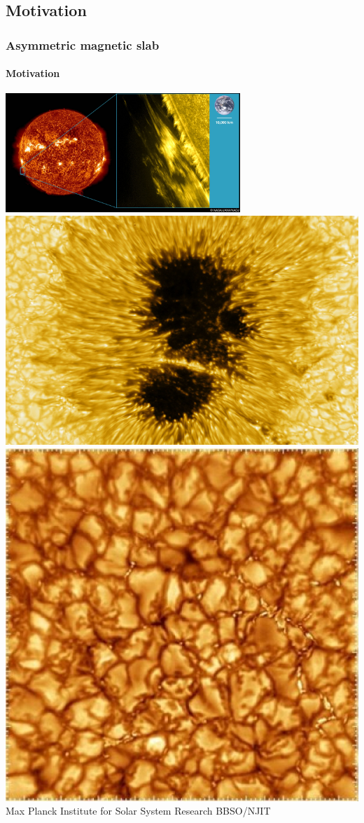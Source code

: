 \documentclass[table]{beamer}
\begin{document}
\subsection{Motivation}

\begin{frame}
\frametitle{Asymmetric magnetic slab}
\framesubtitle{Motivation}
\centering
\includegraphics[height=4.5cm]{media/hinode-prominence.jpg}
\\
\vspace*{0.05in}
\includegraphics[height=3.5 cm]{media/sunspot_lightbridge.png}
\hspace*{0.5in}
\includegraphics[height=3.5 cm]{media/granules.jpg}
\vspace*{-0.05in}
\flushright
\tiny{Max Planck Institute for Solar System Research \hspace*{3.6cm} BBSO/NJIT}
\end{frame}
\end{document}
